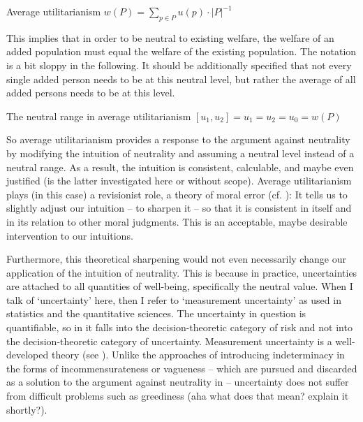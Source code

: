 \begin{Definition}{Average utilitarianism}{}
$w(P) = \sum_{p \in P} u(p) \cdot |P|^{-1}$
\end{Definition}

This implies that in order to be neutral to existing welfare, the welfare of an added population must equal the welfare of the existing population. The notation is a bit sloppy in the following. It should be additionally specified that not every single added person needs to be at this neutral level, but rather the average of all added persons needs to be at this level.  

\begin{Definition}{The neutral range in average utilitarianism}{}
$[u_1, u_2] = u_1 = u_2 = u_0 = w(P)$
\end{Definition}

So average utilitarianism provides a response to the argument against neutrality by modifying the intuition of neutrality and assuming a neutral level instead of a neutral range. As a result, the intuition is consistent, calculable, and maybe even justified (is the latter investigated here or without scope). Average utilitarianism plays (in this case) a revisionist role, a theory of moral error (cf. ): It tells us to slightly adjust our intuition – to sharpen it – so that it is consistent in itself and in its relation to other moral judgments. This is an acceptable, maybe desirable intervention to our intuitions.  

Furthermore, this theoretical sharpening would not even necessarily change our application of the intuition of neutrality. This is because in practice, uncertainties are attached to all quantities of well-being, specifically the neutral value. When I talk of ‘uncertainty’ here, then I refer to ‘measurement uncertainty’ as used in statistics and the quantitative sciences. The uncertainty in question is quantifiable, so in it falls into the decision-theoretic category of risk and not into the decision-theoretic category of uncertainty. Measurement uncertainty is a well-developed theory (see ). Unlike the approaches of introducing indeterminacy in the forms of incommensurateness or vagueness – which are pursued and discarded as a solution to the argument against neutrality in  – uncertainty does not suffer from difficult problems such as greediness (aha what does that mean? explain it shortly?).  

